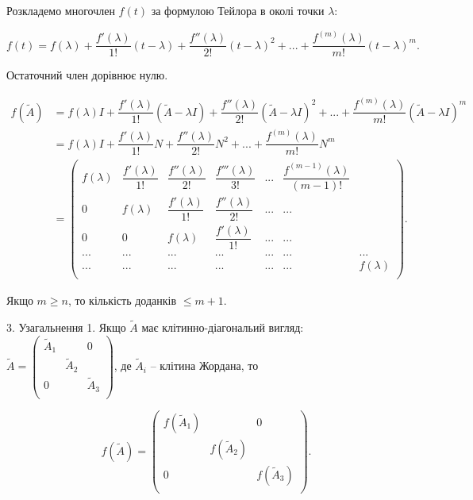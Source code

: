 Розкладемо многочлен $f(t)$ за формулою Тейлора в околі точки $\lambda$:

$$f(t) = f(\lambda)
		+ \dfrac{f'(\lambda)}{1!}(t - \lambda)
		+ \dfrac{f''(\lambda)}{2!}(t - \lambda)^2
		+ ...
		+ \dfrac{f^{(m)}(\lambda)}{m!}(t - \lambda)^m.$$

Остаточний член дорівнює нулю.

\begin{equation*}
    \begin{split}
        f(\tilde{A})
        & = f(\lambda)I
        + \dfrac{f'(\lambda)}{1!}(\tilde{A} - \lambda I)
        + \dfrac{f''(\lambda)}{2!}(\tilde{A} - \lambda I)^2
        + ...
        + \dfrac{f^{(m)}(\lambda)}{m!}(\tilde{A} - \lambda I)^m\\
        & = f(\lambda)I
        + \dfrac{f'(\lambda)}{1!}N
        + \dfrac{f''(\lambda)}{2!}N^2
        + ...
        + \dfrac{f^{(m)}(\lambda)}{m!}N^m \\
        & = \begin{pmatrix}
        	f(\lambda) & \dfrac{f'(\lambda)}{1!} & \dfrac{f''(\lambda)}{2!} & \dfrac{f'''(\lambda)}{3!} & ... & \dfrac{f^{(m-1)}(\lambda)}{(m-1)!} \\
        	0 & f(\lambda) & \dfrac{f'(\lambda)}{1!} & \dfrac{f''(\lambda)}{2!} & ... & ...  \\
        	0 & 0 & f(\lambda) & \dfrac{f'(\lambda)}{1!} & ... & ... \\
        	... & ... & ... & ... & ... & ... & ... \\
        	... & ... & ... & ... & ... & ... & f(\lambda) \\
        \end{pmatrix}.
    \end{split}
\end{equation*}


Якщо $m \geqslant n$, то кількість доданків $\leqslant m + 1$.

3. Узагальнення 1.
Якщо $\tilde{A}$ має клітинно-діагональий вигляд:$\tilde{A} = \begin{pmatrix}
	\tilde{A}_1 &             & 0           \\
	            & \tilde{A}_2 &             \\
	0           &             & \tilde{A}_3 \\
\end{pmatrix}$, де $\tilde{A}_i$ -- клітина Жордана, то


$$f(\tilde{A}) = \begin{pmatrix}
	f(\tilde{A}_1) &                & 0              \\
	               & f(\tilde{A}_2) &                \\
	0              &                & f(\tilde{A}_3) \\
\end{pmatrix}.$$

